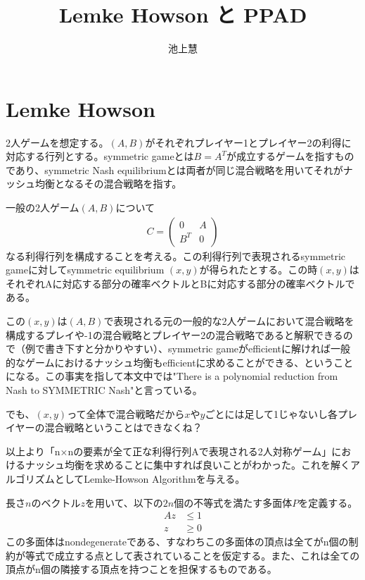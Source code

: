 \documentclass{jsarticle}
\begin{document}
\title{Lemke Howson と PPAD}
\author{池上慧}
\maketitle

\section{Lemke Howson}

2人ゲームを想定する。$(A, B)$がそれぞれプレイヤー1とプレイヤー2の利得に対応する行列とする。symmetric gameとは$B = A^T$が成立するゲームを指すものであり、symmetric Nash equilibriumとは両者が同じ混合戦略を用いてそれがナッシュ均衡となるその混合戦略を指す。

一般の2人ゲーム$(A,B)$について
\begin{align}
	C = \begin{pmatrix}
			0 & A \\
			B^T & 0 
		\end{pmatrix}
\end{align}
なる利得行列を構成することを考える。この利得行列で表現されるsymmetric gameに対してsymmetric equilibrium $(x, y)$が得られたとする。この時$(x, y)$はそれぞれAに対応する部分の確率ベクトルとBに対応する部分の確率ベクトルである。

この$(x, y)$は$(A, B)$で表現される元の一般的な2人ゲームにおいて混合戦略を構成するプレイや-1の混合戦略とプレイヤー2の混合戦略であると解釈できるので（例で書き下すと分かりやすい）、symmetric gameがefficientに解ければ一般的なゲームにおけるナッシュ均衡もefficientに求めることができる、ということになる。この事実を指して本文中では"There is a polynomial reduction from Nash to SYMMETRIC Nash"と言っている。

でも、$(x, y)$って全体で混合戦略だから$x$や$y$ごとには足して1じゃないし各プレイヤーの混合戦略ということはできなくね？

以上より「n×nの要素が全て正な利得行列Aで表現される2人対称ゲーム」におけるナッシュ均衡を求めることに集中すれば良いことがわかった。これを解くアルゴリズムとしてLemke-Howson Algorithmを与える。

長さ$n$のベクトル$z$を用いて、以下の$2n$個の不等式を満たす多面体$P$を定義する。
\begin{align}
	Az &\leq 1\\
	z &\geq 0
\end{align}
この多面体はnondegenerateである、すなわちこの多面体の頂点は全てがn個の制約が等式で成立する点として表されていることを仮定する。また、これは全ての頂点がn個の隣接する頂点を持つことを担保するものである。
\end{document}
